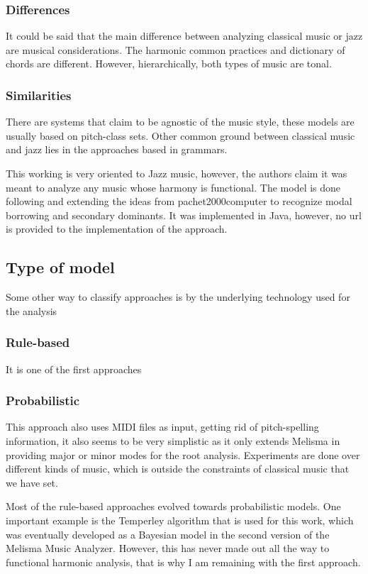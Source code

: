     \subsubsection{Differences}
    It could be said that the main difference between analyzing classical music or jazz are musical considerations. The harmonic common practices and dictionary of chords are different. However, hierarchically, both types of music are tonal.
    \subsubsection{Similarities}
    There are systems that claim to be agnostic of the music style, these models are usually based on pitch-class sets. Other common ground between classical music and jazz lies in the approaches based in grammars.

    This working is very oriented to Jazz music, however, the authors claim it was meant to analyze any music whose harmony is functional. The model is done following and extending the ideas from pachet2000computer to recognize modal borrowing and secondary dominants. It was implemented in Java, however, no url is provided to the implementation of the approach.
  \subsection{Type of model}
  Some other way to classify approaches is by the underlying technology used for the analysis
    \subsubsection{Rule-based}
    It is one of the first approaches
    \subsubsection{Probabilistic}

    This approach also uses MIDI files as input, getting rid of pitch-spelling information, it also seems to be very simplistic as it only extends Melisma in providing major or minor modes for the root analysis. Experiments are done over different kinds of music, which is outside the constraints of classical music that we have set.

    Most of the rule-based approaches evolved towards probabilistic models. One important example is the Temperley algorithm that is used for this work, which was eventually developed as a Bayesian model in the second version of the Melisma Music Analyzer. However, this has never made out all the way to functional harmonic analysis, that is why I am remaining with the first approach.
